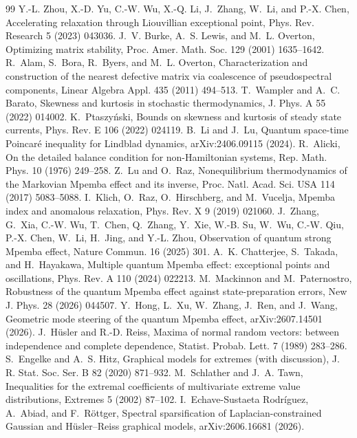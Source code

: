 \documentclass[11pt]{article}
\theoremstyle{definition}
\begin{document}
\begin{thebibliography}{99}
 Y.-L. Zhou, X.-D. Yu, C.-W. Wu, X.-Q. Li, J.~Zhang, W.~Li, and P.-X. Chen, Accelerating relaxation through Liouvillian exceptional point, Phys. Rev. Research 5 (2023) 043036.
 J.~V. Burke, A.~S. Lewis, and M.~L. Overton, Optimizing matrix stability, Proc. Amer. Math. Soc. 129 (2001) 1635--1642.
 R.~Alam, S.~Bora, R.~Byers, and M.~L. Overton, Characterization and construction of the nearest defective matrix via coalescence of pseudospectral components, Linear Algebra Appl. 435 (2011) 494--513.
 T.~Wampler and A.~C. Barato, Skewness and kurtosis in stochastic thermodynamics, J. Phys. A 55 (2022) 014002.
 K.~Ptaszy\'nski, Bounds on skewness and kurtosis of steady state currents, Phys. Rev. E 106 (2022) 024119.
 B.~Li and J.~Lu, Quantum space-time Poincar\'e inequality for Lindblad dynamics, arXiv:2406.09115 (2024).
 R.~Alicki, On the detailed balance condition for non-Hamiltonian systems, Rep. Math. Phys. 10 (1976) 249--258.
 Z.~Lu and O.~Raz, Nonequilibrium thermodynamics of the Markovian Mpemba effect and its inverse, Proc. Natl. Acad. Sci. USA 114 (2017) 5083--5088.
 I.~Klich, O.~Raz, O.~Hirschberg, and M.~Vucelja, Mpemba index and anomalous relaxation, Phys. Rev. X 9 (2019) 021060.
 J.~Zhang, G.~Xia, C.-W. Wu, T.~Chen, Q.~Zhang, Y.~Xie, W.-B. Su, W.~Wu, C.-W. Qiu, P.-X. Chen, W.~Li, H.~Jing, and Y.-L. Zhou, Observation of quantum strong Mpemba effect, Nature Commun. 16 (2025) 301.
 A.~K. Chatterjee, S.~Takada, and H.~Hayakawa, Multiple quantum Mpemba effect: exceptional points and oscillations, Phys. Rev. A 110 (2024) 022213.
 M.~Mackinnon and M.~Paternostro, Robustness of the quantum Mpemba effect against state-preparation errors, New J. Phys. 28 (2026) 044507.
 Y.~Hong, L.~Xu, W.~Zhang, J.~Ren, and J.~Wang, Geometric mode steering of the quantum Mpemba effect, arXiv:2607.14501 (2026).
 J.~H\"usler and R.-D. Reiss, Maxima of normal random vectors: between independence and complete dependence, Statist. Probab. Lett. 7 (1989) 283--286.
 S.~Engelke and A.~S. Hitz, Graphical models for extremes (with discussion), J. R. Stat. Soc. Ser. B 82 (2020) 871--932.
 M.~Schlather and J.~A. Tawn, Inequalities for the extremal coefficients of multivariate extreme value distributions, Extremes 5 (2002) 87--102.
 I.~Echave-Sustaeta Rodr\'iguez, A.~Abiad, and F.~R\"ottger, Spectral sparsification of Laplacian-constrained Gaussian and H\"usler--Reiss graphical models, arXiv:2606.16681 (2026).

\end{thebibliography}
\end{document}
